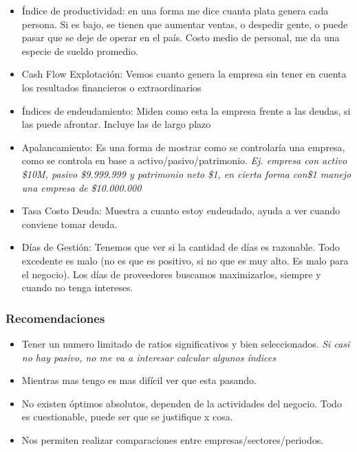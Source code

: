 \documentclass[titlepage,a4paper]{article}
\begin{document}
\begin{itemize}
\item Índice de productividad: en una forma me dice cuanta plata genera cada persona. Si es bajo, se tienen que aumentar ventas, o despedir gente, o puede pasar que se deje de operar en el país. Costo medio de personal, me da una especie de sueldo promedio.
\item Cash Flow Explotación: Vemos cuanto genera la empresa sin tener en cuenta los resultados financieros o extraordinarios
\item Índices de endeudamiento: Miden como esta la empresa frente a las deudas, si las puede afrontar. Incluye las de largo plazo
\item Apalancamiento: Es una forma de mostrar como se controlaría una empresa, como se controla en base a activo/pasivo/patrimonio. \textit{Ej. empresa con activo \$10M, pasivo \$9.999.999 y patrimonio neto \$1, en cierta forma con\$1 manejo una empresa de \$10.000.000}
\item Tasa Costo Deuda: Muestra a cuanto estoy endeudado, ayuda a ver cuando conviene tomar deuda.
\item Días de Gestión: Tenemos que ver si la cantidad de días es razonable. Todo excedente es malo (no es que es positivo, si no que es muy alto. Es malo para el negocio). Los días de proveedores buscamos maximizarlos, siempre y cuando no tenga intereses.
\end{itemize}






\subsubsection*{Recomendaciones}
\begin{itemize}
    \item Tener un numero limitado de ratios significativos y bien seleccionados. \textit{Si casi no hay pasivo, no me va a interesar calcular algunos índices}
    \item Mientras mas tengo es mas difícil ver que esta pasando.
    \item No existen óptimos absolutos, dependen de la actividades del negocio. Todo es cuestionable, puede ser que se justifique x cosa.
    \item Nos permiten realizar comparaciones entre empresas/sectores/periodos. 
\end{itemize}
\end{document}
